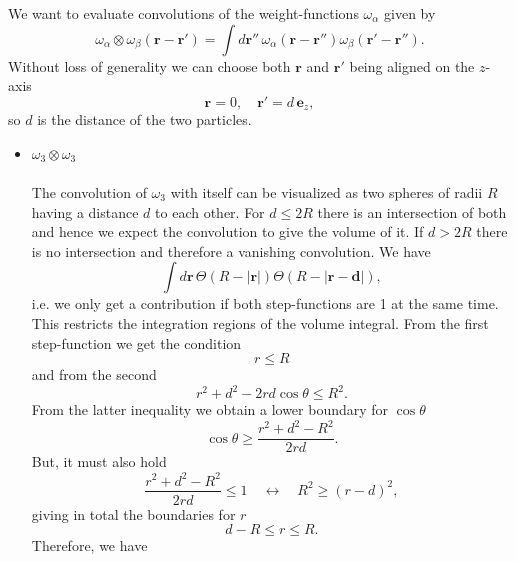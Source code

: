 \documentclass{article}
\begin{document}
We want to evaluate convolutions of the weight-functions $\omega_\alpha$ given by
\begin{equation}
	\omega_\alpha\otimes\omega_\beta(\mathbf{r}-\mathbf{r}') = \int d\mathbf{r}''\,\omega_\alpha(\mathbf{r}-\mathbf{r}'')\omega_\beta(\mathbf{r'-\mathbf{r}''}).
\end{equation}
Without loss of generality we can choose both $\mathbf{r}$ and $\mathbf{r}'$ being aligned on the $z$-axis
\begin{equation}
	\mathbf{r} = 0,\quad \mathbf{r}' = d\,\mathbf{e}_z,
\end{equation}
so $d$ is the distance of the two particles.\\
\begin{itemize}
	\item $\omega_3\otimes\omega_3$\\\\
		The convolution of $\omega_3$ with itself can be visualized as two spheres of radii $R$ having a distance $d$ to each other. For $d\leq 2R$ there is an intersection of both and hence we expect the convolution to give the volume of it. If $d>2R$ there is no intersection and therefore a vanishing convolution.
		We have
		\begin{equation*}
			\int d\mathbf{r}\,\Theta(R-|\mathbf{r}|)\Theta(R-|\mathbf{r}-\mathbf{d}|),
		\end{equation*}
		i.e. we only get a contribution if both step-functions are 1 at the same time. This restricts the integration regions of the volume integral. From the first step-function we get the condition
		\begin{equation*}
			r\leq R
		\end{equation*}
		and from the second
		\begin{equation*}
			r^2+d^2-2rd\cos\theta\leq R^2.
		\end{equation*}
		From the latter inequality we obtain a lower boundary for $\cos\theta$
		\begin{equation*}
			\cos\theta\geq \frac{r^2+d^2-R^2}{2rd}.
		\end{equation*} 
		But, it must also hold 
		\begin{equation*}
			\frac{r^2+d^2-R^2}{2rd}\leq 1\quad \leftrightarrow\quad R^2\geq (r-d)^2,
		\end{equation*}
		giving in total the boundaries for $r$
		\begin{equation*}
			d-R\leq r\leq R.
		\end{equation*}
		Therefore, we have
		\begin{align*}

\end{align*}
\end{itemize}
\end{document}
